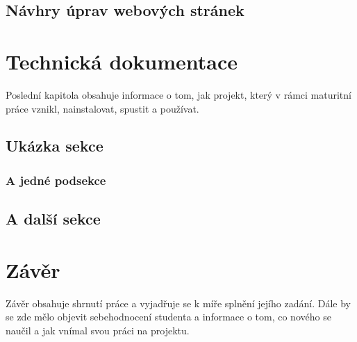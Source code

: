 \documentclass[11pt,a4paper,twoside,openright]{report}
\let\openright=\cleardoublepage
\begin{document}
\section{Návhry úprav webových stránek}


\chapter{Technická dokumentace}

Poslední kapitola obsahuje informace o tom, jak projekt, který v rámci maturitní práce vznikl, nainstalovat, spustit a používat.

\section{Ukázka sekce}

\lipsum[5]

\subsection{A jedné podsekce}

\lipsum

\section{A další sekce}

\lipsum

\chapter*{Závěr}
\pagestyle{empty}

Závěr obsahuje shrnutí práce a vyjadřuje se k míře splnění jejího zadání. Dále by se zde mělo objevit sebehodnocení studenta a informace o tom, co nového se naučil a jak vnímal svou práci na projektu.

\nocite{einstein}\nocite{latexcompanion}\nocite{knuthwebsite}
\printbibliography[title={Seznam použité literatury},heading={bibintoc}]

\openright
\listoffigures
{}

\clearpage
\listoftables
{}


\end{document}
